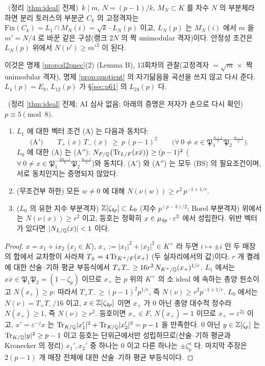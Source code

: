 \begin{proposition}[탑 구조]\tagP\ (정리 \ref{thm:ideal} 전제)\
$k\mid m$, $N=(p-1)/k$, $M_N\subset K$ 를 차수 $N$ 의 부분체라 하면 분리 토러스의 부분군 $C_k$ 의 고정격자는
$\mathrm{Fix}(C_k)=L_1\cap M_N(i)=\sqrt k\cdot L_N(p)$ 이고, $L_N(p)$ 는 $M_N(i)$ 에서 $m$ 을 $m'=N/4$ 로 바꾼 같은 구성(랭크 $2N$ 의 짝 unimodular 격자)이다. 안정성 조건은 $L_N(p)$ 위에서 $N(\nu')\ge m'^2$ 이 된다.
\end{proposition}
\noindent 이것은 명제 \ref{prop:sl2pnec}(2) (Lemma B), 13회차의 관찰(고정격자 $=\sqrt m\,\times$ 짝 unimodular 격자), 명제 \ref{prop:quotient} 의 자기닮음을 곡선을 쓰지 않고 다시 준다. $L_4(p)=E_8$, $L_{12}(p)$ 가 \S\ref{sec:p61} 의 $L_{24}(p)$ 다.

\begin{theorem}[(A) 의 환원과 부분 증명]\label{thm:Apartial}\tagP\ (정리 \ref{thm:ideal} 전제; AI 심사 없음; 아래의 증명은 저자가 손으로 다시 확인)\
$p\equiv5\pmod8$.
\begin{enumerate}
\item $L_1$ 에 대한 벡터 조건 (A) 는 다음과 동치다:
\[
\text{(A$'$)}\qquad T_+(x)\,T_-(x)\ \ge\ p\,(p-1)^2\qquad\big(\forall\ 0\ne x\in\mathfrak P_1^{\frac{m+1}2}\mathfrak P_2^{-\frac{m-1}2}\big).
\]
$L_0$ 에 대한 (A) 는 (A$''$): $N_{F/\mathbb{Q}}\big(\mathrm{Tr}_{L/F}(x\bar x)\big)\ge(p-1)^2$ ($\forall\ 0\ne x\in\mathfrak P_1^{-\frac{3m-1}2}\mathfrak P_2^{-\frac{m-1}2}$)와 동치다. (A$'$) 와 (A$''$) 는 모두 (BS) 의 필요조건이며, 서로 동치인지는 증명되지 않았다.
\item (무조건부 하한) 모든 $w\ne0$ 에 대해 $N(\nu(w))\ge r^2\,p^{-1+1/r}$.
\item ($L_0$ 의 유한 지수 부분격자) $\mathbb{Z}[\zeta_{4p}]\subset L_0$ (지수 $p^{(p-3)/2}$; Borel 부분격자) 위에서는 $N(\nu(x))\ge r^2$ 이고, 등호는 정확히 $x\in\mu_{4p}\cdot\varepsilon^{\mathbb{Z}}$ 에서 성립한다. 위반 벡터가 있다면 $|N_{L/\mathbb{Q}}(x)|<1$ 이다.
\end{enumerate}
\end{theorem}
\begin{proof}
$x=x_1+ix_2$ ($x_j\in K$), $x_+:=|x_1|^2+|x_2|^2\in K^+$ 라 두면 $i\mapsto\pm i$ 인 두 매장의 합에서 교차항이 사라져 $T_\pm=4\,\mathrm{Tr}_{K^+/F}(x_+)$ (두 실자리에서의 값)이다. $r$ 개 켤레에 대한 산술--기하 평균 부등식에서 $T_+T_-\ge16r^2\,N_{K^+/\mathbb{Q}}(x_+)^{1/r}$. $L_1$ 에서는 $x\bar x\in\mathfrak P_1\mathfrak P_2=(1-\zeta_p)$ 이므로 $x_+$ 는 $p$ 위의 $K^+$ 의 소 ideal 에 속하는 총양 원소이고 $N(x_+)\ge p$: 따라서 $T_+T_-\ge(p-1)^2p^{1/r}$, 즉 $N(\nu)\ge r^2p^{-1+1/r}$. $L_0$ 에서는 $N(\nu)=T_+T_-/16$ 이고, $x\in\mathbb{Z}[\zeta_{4p}]$ 이면 $x_+$ 가 0 아닌 총양 대수적 정수라 $N(x_+)\ge1$, 즉 $N(\nu)\ge r^2$. 등호이면 $x_+\in F$, $N(x_+)=1$ 이므로 $x_+=\varepsilon^{2j}$ 이고, $x'=\varepsilon^{-j}x$ 는 $\mathrm{Tr}_{K/\mathbb{Q}}|x_1'|^2+\mathrm{Tr}_{K/\mathbb{Q}}|x_2'|^2=p-1$ 을 만족한다. 0 아닌 $y\in\mathbb{Z}[\zeta_p]$ 는 $\mathrm{Tr}_{K/\mathbb{Q}}|y|^2\ge p-1$ 이고 등호는 단위근에서만 성립하므로(산술--기하 평균과 Kronecker 의 정리) $x_1',x_2'$ 중 하나는 0 이고 다른 하나는 $\pm\zeta_p^a$ 다. 마지막 주장은 $2(p-1)$ 개 매장 전체에 대한 산술--기하 평균 부등식이다.
\end{proof}
